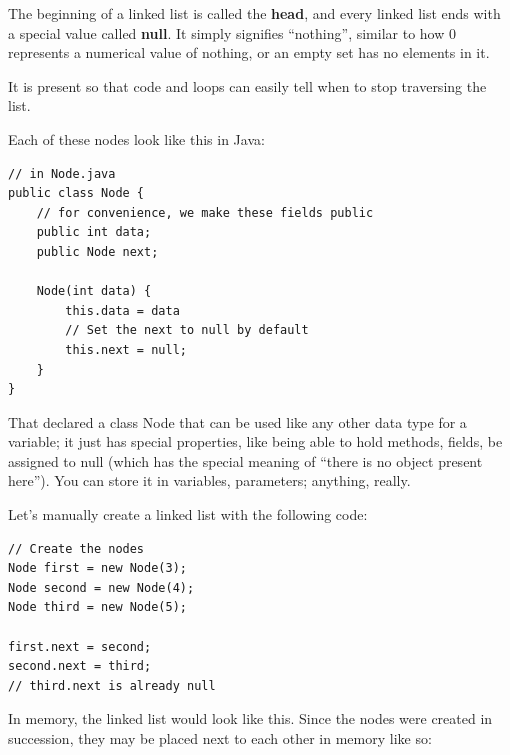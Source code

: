 \documentclass[./main.tex]{subfiles}
\begin{document}
\begin{importantbox}
    The beginning of a linked list is called the \textbf{head}, and every linked list
    ends with a special value called \textbf{null}. It simply signifies ``nothing'',
    similar to how 0 represents a numerical value of nothing, or an empty set has no
    elements in it.
    \par
    It is present so that code and loops can easily tell when to stop traversing the
    list.
\end{importantbox}

Each of these nodes look like this in Java:

\begin{verbatim}
// in Node.java
public class Node {
    // for convenience, we make these fields public
    public int data;
    public Node next;

    Node(int data) { 
        this.data = data
        // Set the next to null by default
        this.next = null;
    }
}
\end{verbatim}

That declared a class {\mono Node} that can be used like any other data type for a variable; it just has
special properties, like being able to hold methods, fields, be assigned to {\mono null} (which has the
special meaning of ``there is no object present here''). You can store it in variables, parameters; anything,
really.

Let's manually create a linked list with the following code:

\begin{verbatim}
// Create the nodes
Node first = new Node(3);
Node second = new Node(4);
Node third = new Node(5);

first.next = second;
second.next = third;
// third.next is already null
\end{verbatim}

In memory, the linked list would look like this. Since the nodes were created in succession, they may be placed next to
each other in memory like so:
\end{document}
